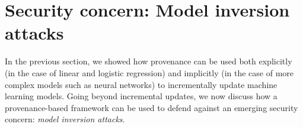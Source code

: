 \documentclass[11pt]{article}
\newcommand{\priu}{PrIU}
\newcommand{\deltagrad}{DeltaGrad}
\begin{document}




% 
\section{Security concern:  Model inversion attacks}
\label{sec: security}
In the previous section, we showed how provenance can be used both explicitly (in the case of linear and logistic regression) and implicitly (in the case of more complex models such as neural networks) to incrementally update machine learning models.  Going beyond incremental updates, we now discuss how a provenance-based framework can be used to defend against an emerging security concern:  \emph{model inversion attacks}.

\end{document}
